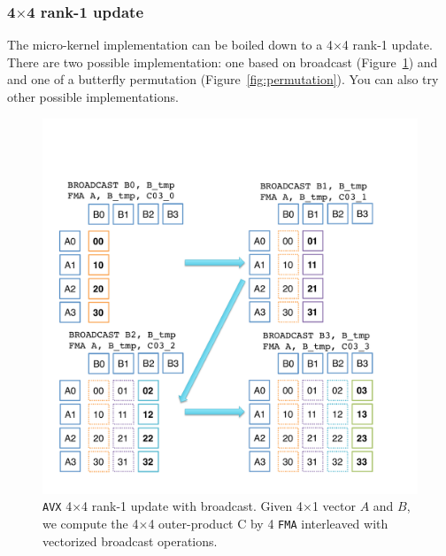 \subsubsection{4$\times$4 rank-1 update}
The micro-kernel implementation can be boiled down to a 4$\times$4 rank-1 update. There are two possible implementation: one based on broadcast (Figure~\ref{fig:broadcast}) and and one of a butterfly permutation (Figure~\ref{fig:permutation}). You can also try other possible implementations.
\begin{figure}
\begin{center}
	\includegraphics[width=5in]{figures/avx_broadcast.pdf}
\end{center}
\caption{{\tt AVX} 4$\times$4 rank-1 update with broadcast. Given 4$\times$1 vector $A$ and $B$, we compute the 4$\times$4 outer-product C by 4 {\tt FMA} interleaved with vectorized broadcast operations.}
\label{fig:broadcast}
\end{figure}


